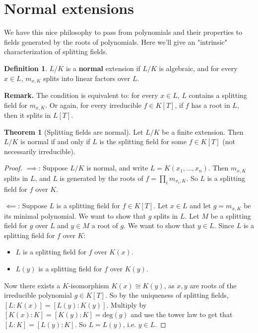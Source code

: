 \documentclass{article}
\theoremstyle{definition}
\newtheorem{theorem}{Theorem}[section]
\newtheorem{defn}{Definition}[section]
\begin{document}
\section{Normal extensions}
    We have this nice philosophy to pass from polynomials and their properties to fields generated by the roots of polynomials. Here we'll give an "intrinsic" characterization of splitting fields.
\begin{defn}
    $L/K$ is a \textbf{normal} extension if $L/K$ is algebraic, and for every $x \in L$, $m_{x,K}$ splits into linear factors over $L$.
\end{defn}
\textbf{Remark.} The condition is equivalent to: for every $x \in L$, $L$ contains a splitting field for $m_{x,K}$. Or again, for every irreducible $f \in K[T]$, if $f$ has a root in $L$, then it splits in $L[T]$. 
\begin{theorem}[Splitting fields are normal]\label{7.1}
    Let $L/K$ be a finite extension. Then $L/K$ is normal if and only if $L$ is the splitting field for some $f \in K[T]$ (not necessarily irreducible).
\end{theorem}
\begin{proof}
    $\implies $: Suppose $L/K$ is normal, and write $L=K(x_1,\ldots,x_n)$. Then $m_{x,K}$ splits in $L$, and $L$ is generated by the roots of $f = \prod_{i}^{} m_{x_i,K}$. So $L$ is a splitting field for $f$ over $K$.
    \vspace{1mm}
    
    $\impliedby$: Suppose $L$ is a splitting field for $f \in K[T]$. Let $x \in L$ and let $g = m_{x,K}$ be its minimal polynomial. We want to show that $g$ splits in $L$. Let $M$ be a splitting field for $g$ over $L$ and $y \in M$ a root of $g$. We want to show that $y \in L$. Since $L$ is a splitting field for $f$ over $K$:
    \begin{itemize}
        \item $L$ is a splitting field for $f$ over $K(x)$.
        \item $L(y)$ is a splitting field for $f$ over $K(y)$.
    \end{itemize}
    Now there exists a $K$-isomorphism $K(x) \cong K(y)$, as $x,y$ are roots of the irreducible polynomial $g \in K[T]$. So by the uniqueness of splitting fields, $[L : K (x)] = [L(y) : K(y)]$. Multiply by $[K(x) : K] = [K(y) : K] = \text{deg}(g)$ and use the tower law to get that $[L:K] = [L(y) : K]$. So $L=L(y)$, i.e. $y \in L$.
\end{proof}

\end{document}
